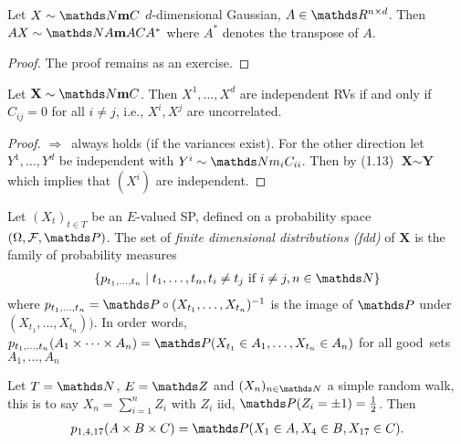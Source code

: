\begin{prop}
Let $X \sim \N{\textbf{m}}{C}$ $d$-dimensional Gaussian, $A \in \R^{n\times d}$.
Then $AX\sim \N{A\textbf{m}}{ACA^\ast}$ where $A^\ast$ denotes the transpose of $A$.
\begin{proof}
The proof remains as an exercise.
\end{proof}
\end{prop}

\begin{prop}
Let $\textbf{X}\sim \N{\textbf{m}}{C}$.
Then $X^1,\dots,X^d$ are independent RVs if and only if $C_{ij}=0$ for all $i\not = j$, i.e., $X^i,X^j$ are uncorrelated.
\begin{proof}
\glqq $\Rightarrow$\grqq\, always holds (if the variances exist).
For the other direction let $Y^1,\dots,Y^d$ be independent with $Y^i\sim \N{m_i}{C_{ii}}$.
Then by (1.13) $\textbf{X} \sim \textbf{Y}$ which implies that $(X^i)$ are independent.
\end{proof}
\end{prop}

\begin{defi}
Let $(X_t)_{t \in T}$ be an $E$-valued SP, defined on a probability space $(\Omega,\mathcal{F},\Prob)$. The set of \emph{finite dimensional distributions (fdd)} of $\textbf{X}$ is the family of probability measures
\begin{align*}
\{p_{t_1,\dots,t_n}\mid t_1,\dots,t_n, t_i\not =t_j \text{ if } i \not = j,n\in \N\}
\end{align*}
where $p_{t_1,\dots,t_n}=\Prob \circ (X_{t_1},\dots,X_{t_n})^{-1}$ is the image of $\Prob$ under $(X_{t_1},\dots,X_{t_n}))$.
In order words, $p_{t_1,\dots,t_n}(A_1\times \dots \times A_n)=\Prob(X_{t_1}\in A_1,\dots,X_{t_n}\in A_n)$ for all \glqq good\grqq\, sets $A_1,\dots,A_n$
\end{defi}

\begin{bsp}
Let $T=\N$, $E=\Z$ and $(X_n)_{n\in \N}$ a simple random walk, this is to say
$X_n=\sum_{i=1}^n Z_i$ with $Z_i$ iid, $\Prob(Z_i=\pm 1)=\frac{1}{2}$.
Then
\begin{align*}
p_{1,4,17}(A\times B\times C)=\Prob(X_1\in A,X_4\in B,X_{17}\in C).
\end{align*}
\end{bsp}

